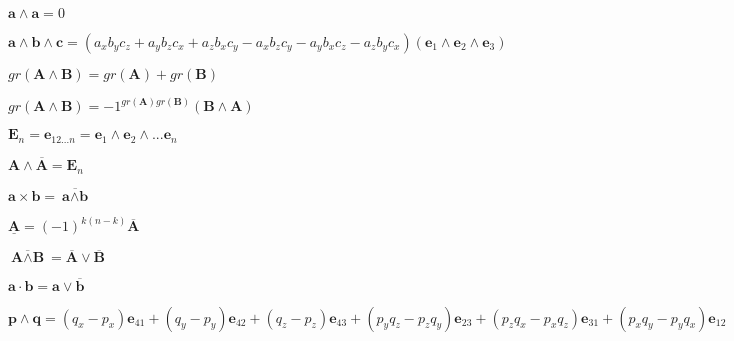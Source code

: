 \documentclass{article}
\def\lthtmlcheckvsize{\ifdim\ht\sizebox<\vsize 
  \ifdim\wd\sizebox<\hsize\expandafter\hfill\fi \expandafter\vfill
  \else\expandafter\vss\fi}%
\begin{document}
{\newpage\clearpage
{}%
$ \textbf{a} \wedge \textbf{a} = 0 $%
\lthtmlindisplaymathZ
\lthtmlcheckvsize\clearpage}

{\newpage\clearpage
{}%
$ \textbf{a} \wedge \textbf{b} \wedge \textbf{c} = 
(a_xb_yc_z + a_yb_zc_x + a_zb_xc_y - a_xb_zc_y - a_yb_xc_z - a_zb_yc_x)
(\textbf{e}_1 \wedge \textbf{e}_2 \wedge \textbf{e}_3) $%
\lthtmlindisplaymathZ
\lthtmlcheckvsize\clearpage}

{\newpage\clearpage
{}%
$ gr(\textbf{A} \wedge \textbf{B})  = gr(\textbf{A}) + gr(\textbf{B}) $%
\lthtmlindisplaymathZ
\lthtmlcheckvsize\clearpage}

{\newpage\clearpage
{}%
$ gr(\textbf{A} \wedge \textbf{B}) = -1^{gr(\textbf{A})gr(\textbf{B})}(\textbf{B} \wedge \textbf{A}) $%
\lthtmlindisplaymathZ
\lthtmlcheckvsize\clearpage}

{\newpage\clearpage
{}%
$ \textbf{E}_n = \textbf{e}_{12...n} = \textbf{e}_1 \wedge \textbf{e}_2 \wedge ... \textbf{e}_n $%
\lthtmlindisplaymathZ
\lthtmlcheckvsize\clearpage}

{\newpage\clearpage
{}%
$ \textbf{A} \wedge \overline{\textbf{A}} = \textbf{E}_n $%
\lthtmlindisplaymathZ
\lthtmlcheckvsize\clearpage}

{\newpage\clearpage
{}%
$ \textbf{a} \times \textbf{b} = \overline{\textbf{a} \wedge \textbf{b}} $%
\lthtmlindisplaymathZ
\lthtmlcheckvsize\clearpage}

{\newpage\clearpage
{}%
$ \underline{\textbf{A}} = (-1)^{k(n-k)}\overline{\textbf{A}} $%
\lthtmlindisplaymathZ
\lthtmlcheckvsize\clearpage}

{\newpage\clearpage
{}%
$ \overline{\textbf{A} \wedge \textbf{B}} = \overline{\textbf{A}} \vee \overline{\textbf{B}} $%
\lthtmlindisplaymathZ
\lthtmlcheckvsize\clearpage}

{\newpage\clearpage
{}%
$ \textbf{a} \cdot \textbf{b} = \textbf{a} \vee \overline{\textbf{b}} $%
\lthtmlindisplaymathZ
\lthtmlcheckvsize\clearpage}

{\newpage\clearpage
{}%
$ \textbf{p} \wedge \textbf{q} = (q_x - p_x)\textbf{e}_{41} + (q_y - p_y)\textbf{e}_{42} + 
(q_z - p_z)\textbf{e}_{43} + (p_yq_z - p_zq_y)\textbf{e}_{23} + (p_zq_x - p_xq_z)\textbf{e}_{31} +
(p_xq_y - p_yq_x)\textbf{e}_{12} $%
\lthtmlindisplaymathZ
\lthtmlcheckvsize\clearpage}
\end{document}
